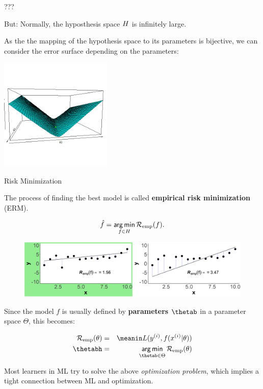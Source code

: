 \documentclass[11pt,compress,t,notes=noshow, xcolor=table]{beamer}
\begin{document}
\begin{vbframe}{???}

But: Normally, the hyposthesis space $H$ is infinitely large. 

\lz

As the the mapping of the hypothesis space to its parameters is bijective, we can consider the error surface depending on the parameters:

\begin{center}
\includegraphics[width=0.4\textwidth]{figure/ml-basic-riskmin-error-surface.png}
\end{center}

\end{vbframe}

\begin{vbframe}{Risk Minimization}


The process of finding the best model is called \textbf{empirical risk minimization} (ERM).

$$
\hat{f} = \mathop{\sf arg\,min}_{f \in H} \mathcal{R}_{\text{emp}}(f).
$$

\lz

\begin{center}
\begin{figure}[b]
\includegraphics[width=1\textwidth]{figure/ml-basic_riskmin-3-risk-min.png}
\end{figure}
\end{center}


\framebreak

Since the model $f$ is usually defined by \textbf{parameters} $\thetab$ in a parameter space $\Theta$, this becomes:

\begin{eqnarray*}
\risket & = & \meanin \Lxyit \cr
\thetabh & = & \argmin_{\thetab \in \Theta} \risket
\end{eqnarray*}

Most learners in ML try to solve the above \emph{optimization problem}, which implies a tight connection between ML and optimization.

\end{vbframe}
\end{document}
